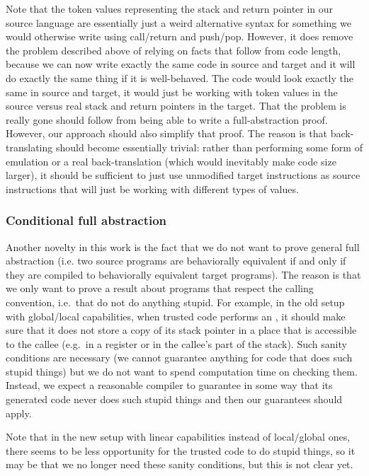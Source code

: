 \documentclass[a4paper]{article}
\begin{document}
Note that the token values representing the stack and return pointer in our source language are essentially just a weird alternative syntax for something we would otherwise write using call/return and push/pop.
However, it does remove the problem described above of relying on facts that follow from code length, because we can now write exactly the same code in source and target and it will do exactly the same thing if it is well-behaved.
The code would look exactly the same in source and target, it would just be working with token values in the source versus real stack and return pointers in the target.
That the problem is really gone should follow from being able to write a full-abstraction proof.
However, our approach should also simplify that proof.
The reason is that back-translating should become essentially trivial: rather than performing some form of emulation or a real back-translation (which would inevitably make code size larger), it should be sufficient to just use unmodified target instructions as source instructions that will just be working with different types of values.


\subsubsection{Conditional full abstraction}
\label{sec:conditional-full-abstraction}

Another novelty in this work is the fact that we do not want to prove general full abstraction (i.e. two source programs are behaviorally equivalent if and only if they are compiled to behaviorally equivalent target programs).
The reason is that we only want to prove a result about programs that respect the calling convention, i.e.\ that do not do anything stupid.
For example, in the old setup with global/local capabilities, when trusted code performs an , it should make sure that it does not store a copy of its stack pointer in a place that is accessible to the callee (e.g.\ in a register or in the callee's part of the stack).
Such sanity conditions are necessary (we cannot guarantee anything for code that does such stupid things) but we do not want to spend computation time on checking them.
Instead, we expect a reasonable compiler to guarantee in some way that its generated code never does such stupid things and then our guarantees should apply.

Note that in the new setup with linear capabilities instead of local/global ones, there seems to be less opportunity for the trusted code to do stupid things, so it may be that we no longer need these sanity conditions, but this is not clear yet.
\end{document}
